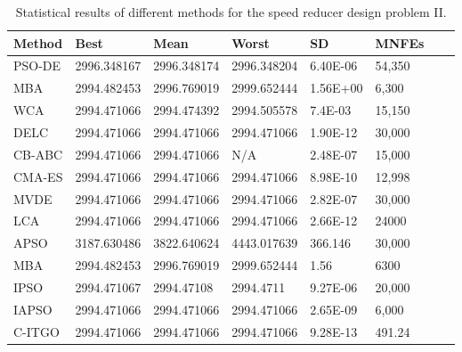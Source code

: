 
\begin{table*}[tp]
    \tiny
    \begin{center}
    
    \begin{tabular}{ P{2.0cm} P{2.0cm} P{2.0cm} P{2.0cm} P{2.0cm} P{2.0cm} P{2.0cm} P{2.0cm}  }
    \hline
    \textbf{Method} & \textbf{Best} & \textbf{Mean} & \textbf{Worst} & \textbf{SD} & \textbf{MNFEs} \\
    \hline
    
    PSO-DE & 2996.348167 & 2996.348174 & 2996.348204 & 6.40E-06 & 54,350 \\
    MBA & 2994.482453 & 2996.769019 & 2999.652444 & 1.56E+00 & 6,300 \\
    WCA & 2994.471066 & 2994.474392 & 2994.505578 & 7.4E-03 & 15,150 \\    
    DELC & 2994.471066 & 2994.471066 & 2994.471066 & 1.90E-12 & 30,000 \\
    CB-ABC & 2994.471066 & 2994.471066 & N/A & 2.48E-07 & 15,000 \\
    CMA-ES & 2994.471066 & 2994.471066 & 2994.471066 & 8.98E-10 & 12,998 \\
    MVDE & 2994.471066 & 2994.471066 & 2994.471066 & 2.82E-07 & 30,000 \\    
    LCA & 2994.471066 & 2994.471066 & 2994.471066 & 2.66E-12 & 24000 \\
    APSO & 3187.630486 & 3822.640624 & 4443.017639 & 366.146 & 30,000 \\
    MBA & 2994.482453 & 2996.769019 & 2999.652444 & 1.56 & 6300 \\
    IPSO & 2994.471067 & 2994.47108 & 2994.4711 & 9.27E-06 & 20,000 \\
    IAPSO & 2994.471066 & 2994.471066 & 2994.471066 & 2.65E-09 & 6,000 \\
    C-ITGO & 2994.471066 & 2994.471066 & 2994.471066 & 9.28E-13 & 491.24 \\ 
    
  

    \hline
    \end{tabular}
    \end{center}
    
    \caption{ Statistical results of different methods for the speed reducer design problem II. \\[1em]}
    \label{tab:SP2}
    \end{table*}
    
    
